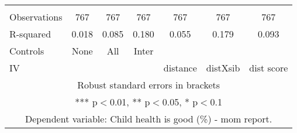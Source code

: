 \begin{tabular}{lcccccc}
 &  &  &  &  &  &  \\
Observations & 767 & 767 & 767 & 767 & 767 & 767 \\
R-squared & 0.018 & 0.085 & 0.180 & 0.055 & 0.179 & 0.093 \\
Controls & None & All & Inter &  &  &  \\
 IV &  &  &  & distance & distXsib & dist score \\ \hline
\multicolumn{7}{c}{ Robust standard errors in brackets} \\
\multicolumn{7}{c}{ *** p$<$0.01, ** p$<$0.05, * p$<$0.1} \\
\multicolumn{7}{c}{ Dependent variable: Child health is good (\%) - mom report.} \\
\end{tabular}
